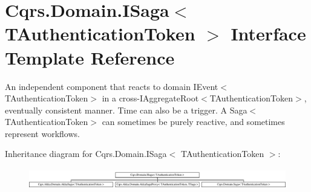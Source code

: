 \hypertarget{interfaceCqrs_1_1Domain_1_1ISaga}{}\section{Cqrs.\+Domain.\+I\+Saga$<$ T\+Authentication\+Token $>$ Interface Template Reference}
\label{interfaceCqrs_1_1Domain_1_1ISaga}


An independent component that reacts to domain I\+Event$<$\+T\+Authentication\+Token$>$ in a cross-\/I\+Aggregate\+Root$<$\+T\+Authentication\+Token$>$, eventually consistent manner. Time can also be a trigger. A Saga$<$\+T\+Authentication\+Token$>$ can sometimes be purely reactive, and sometimes represent workflows.  


Inheritance diagram for Cqrs.\+Domain.\+I\+Saga$<$ T\+Authentication\+Token $>$\+:\begin{figure}[H]
\begin{center}
\leavevmode
\includegraphics[height=0.915033cm]{interfaceCqrs_1_1Domain_1_1ISaga}
\end{center}
\end{figure}
